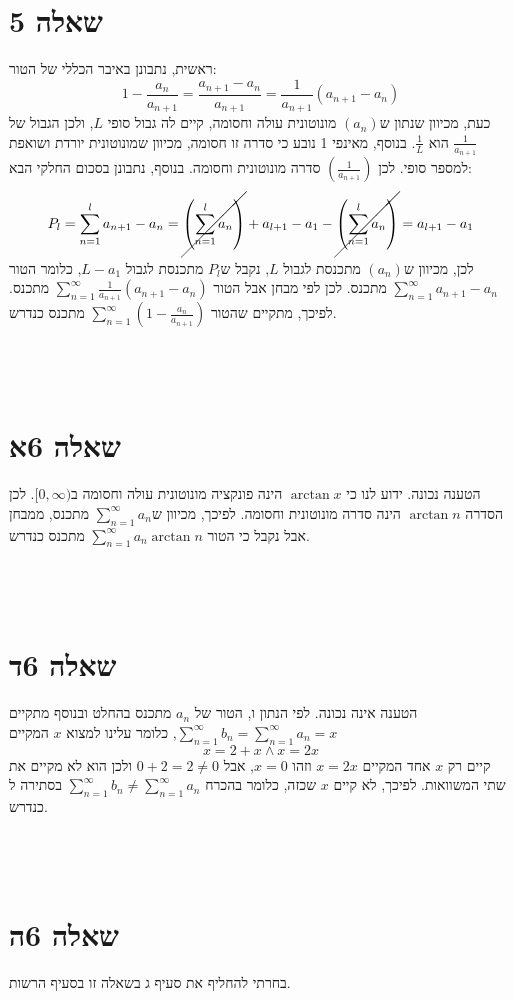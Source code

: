 \documentclass[11pt, oneside]{article}
\newcommand{\qed}{\R{$\blacksquare$}}
\newcommand{\br}{\\\\\\\\}
\newcommand{\m}[3]{\R{משפט #3#2.#1}}
\begin{document}
\section*{שאלה 5}
ראשית, נתבונן באיבר הכללי של הטור:
\[
1 - \frac{a_{n}}{a_{n + 1}}
= \frac{a_{n + 1} - a_{n}}{a_{n + 1}}
= \frac{1}{a_{n + 1}}(a_{n + 1} - a_{n})
\]
כעת, מכיוון שנתון ש$(a_{n})$ מונוטונית עולה וחסומה, קיים לה גבול סופי $L$, ולכן הגבול של $\frac{1}{a_{n + 1}}$ הוא $\frac{1}{L}$. בנוסף, מאינפי 1 נובע כי סדרה זו חסומה, מכיוון שמונוטונית יורדת ושואפת למספר סופי. לכן $\left(\frac{1}{a_{n + 1}}\right)$ סדרה מונוטונית וחסומה. בנוסף, נתבונן בסכום החלקי הבא:
\[
P_{l}
= \sum^{l}_{n = 1} a_{n + 1} - a_{n}
= \cancel{\left(\sum^{l}_{n = 1} a_{n}\right)} + a_{l + 1} - a_{1} - \cancel{\left(\sum^{l}_{n = 1} a_{n}\right)}
= a_{l + 1} - a_{1}
\]
לכן, מכיוון ש$(a_{n})$ מתכנסת לגבול $L$, נקבל ש$P_{l}$ מתכנסת לגבול $L - a_{1}$, כלומר הטור $\sum^{\infty}_{n = 1} a_{n + 1} - a_{n}$ מתכנס. לכן לפי מבחן אבל הטור $\sum^{\infty}_{n = 1} \frac{1}{a_{n + 1}}(a_{n + 1} - a_{n})$ מתכנס. לפיכך, מתקיים שהטור $\sum^{\infty}_{n = 1}(1 - \frac{a_{n}}{a_{n + 1}})$ מתכנס כנדרש.
\br\qed

\section*{שאלה 6א}
הטענה נכונה. ידוע לנו כי $\arctan{x}$ הינה פונקציה מונוטונית עולה וחסומה ב$[0, \infty)$. לכן הסדרה $\arctan{n}$ הינה סדרה מונוטונית וחסומה. לפיכך, מכיוון ש$\sum^{\infty}_{n = 1} a_{n}$ מתכנס, ממבחן אבל נקבל כי הטור $\sum^{\infty}_{n = 1} a_{n}\arctan{n}$ מתכנס כנדרש.
\br\qed

\section*{שאלה 6ד}
הטענה אינה נכונה. לפי הנתון ו\m{5}{62}{}, הטור של $a_{n}$ מתכנס בהחלט ובנוסף מתקיים $\sum^{\infty}_{n = 1} b_{n} = \sum^{\infty}_{n = 1} a_{n} = x$, כלומר עלינו למצוא $x$ המקיים
\[
x = 2 + x \land x = 2x
\]
קיים רק $x$ אחד המקיים $x = 2x$ וזהו $x = 0$, אבל $0 + 2 = 2 \neq 0$ ולכן הוא לא מקיים את שתי המשוואות. לפיכך, לא קיים $x$ שכזה, כלומר בהכרח $\sum^{\infty}_{n = 1} b_{n} \neq \sum^{\infty}_{n = 1} a_{n}$ בסתירה ל\m{5}{62}{} כנדרש.
\br\qed
\clearpage

\section*{שאלה 6ה}
בחרתי להחליף את סעיף ג בשאלה זו בסעיף הרשות.
\end{document}
